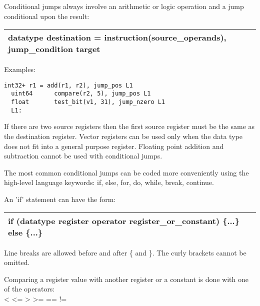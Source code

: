 \documentclass[forwardcom.tex]{subfiles}
\begin{document}
Conditional jumps always involve an arithmetic or logic operation and a jump conditional upon the result:

\begin{tabular}{|p{150mm}|}
\hline
\hspace{4mm} datatype destination = instruction(source\_operands), jump\_condition target \\
\hline
\end{tabular}
\vspace{4mm}

Examples:
\vspace{2mm}

\begin{lstlisting}[frame=single]
  int32+ r1 = add(r1, r2), jump_pos L1
  uint64      compare(r2, 5), jump_pos L1
  float       test_bit(v1, 31), jump_nzero L1
  L1:
\end{lstlisting}
\vspace{2mm}

If there are two source registers then the first source register must be the same as the destination register. Vector registers can be used only when the data type does not fit into a general purpose register. Floating point addition and subtraction cannot be used with conditional jumps.
\vspace{2mm}

The most common conditional jumps can be coded more conveniently using the high-level language keywords: if, else, for, do, while, break, continue.
\vspace{2mm}

An 'if' statement can have the form:
\vspace{2mm}

\begin{tabular}{|p{150mm}|}
\hline
\hspace{4mm} if (datatype register operator register\_or\_constant) \{...\} else \{...\}\\
\hline
\end{tabular}
\vspace{2mm}

Line breaks are allowed before and after \{ and \}. The curly brackets cannot be omitted.

Comparing a register value with another register or a constant is done with one of the operators:\\
\textless \hspace{2mm} \textless= \hspace{2mm} \textgreater \hspace{2mm} \textgreater= \hspace{2mm} 
 == \hspace{2mm} != \hspace{2mm} 
\vspace{2mm}
\end{document}

